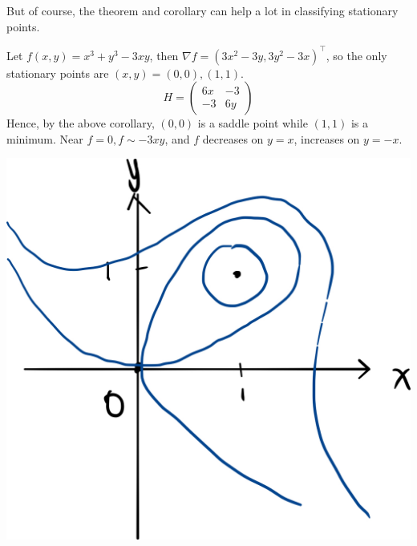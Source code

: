 \documentclass[a4paper]{article}
\begin{document}
But of course, the theorem and corollary can help a lot in classifying stationary points.
\begin{example}
    Let $f(x,y)=x^3+y^3-3xy$, then $\nabla f=(3x^2-3y,3y^2-3x)^\top$, so the only stationary points are $(x,y)=(0,0),(1,1)$.
    $$H=\begin{pmatrix}
        6x&-3\\
        -3&6y
    \end{pmatrix}$$
    Hence, by the above corollary, $(0,0)$ is a saddle point while $(1,1)$ is a minimum. Near $ f=0, f \sim -3xy $, and $f$ decreases on $y=x$, increases on $y=-x$.
    \begin{center}\vspace{1ex}
        \includegraphics[scale=0.1]{phase_1.1.jpeg}
    \end{center}
\end{example}
\end{document}
